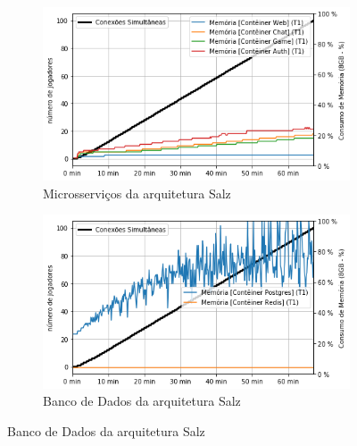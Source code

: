 \begin{figure}[htb!]
    \begin{subfigure}{.5\textwidth}
        \centering
        \includegraphics[width=.95\linewidth]{figuras/testes/s_mem_game.png}
        \caption{Microsserviços da arquitetura Salz}
        \label{fig:s_mem_game}
    \end{subfigure}%
    \begin{subfigure}{.5\textwidth}
        \centering
        \includegraphics[width=.95\linewidth]{figuras/testes/s_mem_db.png}
        \caption{Banco de Dados da arquitetura Salz}
        \label{fig:s_mem_db}
    \end{subfigure}%


\end{figure}
